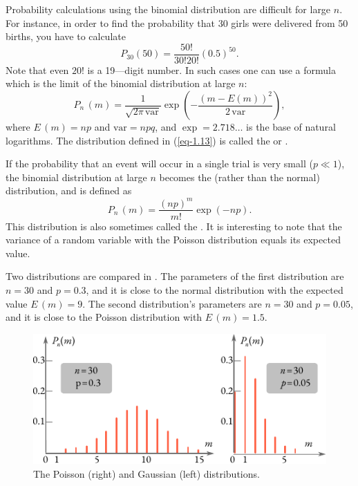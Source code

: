  Probability calculations using the
binomial distribution are difficult for large $n$. For instance, in order to
find the probability that 30 girls were delivered from 50 births, you have
to calculate
\begin{equation*}
P_{30}(50) = \frac{50!}{30!20!} (0.5)^{50}.
\end{equation*}
Note that even $20!$ is a 19—digit number. In such cases one can use a
formula which is the limit of the binomial distribution at large $n$:
\begin{equation}%
P_{n}\,(m) = \frac{1}{\sqrt{2 \pi \, \textrm{var}}} \exp \left( -  \frac{(m - E(m))^{2}}{2 \, \textrm{var}}  \right),
\label{eq-1.13}
\end{equation}
where $E\,(m) = np$ and $\textrm{var} = npq$, and $\exp = 2.718 \ldots$
is the base of natural logarithms. The distribution deﬁned in
(\ref{eq-1.13}) is called the  or .


 If the probability that an event will
occur in a single trial is very small ($p \ll1$), the binomial distribution at
large $n$  becomes the  (rather than the normal) distribution, and is deﬁned as
\begin{equation}%
P_{n}\,(m) = \frac{(np)^{m}}{m!} \exp (-np).
\label{eq-1.14}
\end{equation}
This distribution is also sometimes called the . It is
interesting to note that the variance of a random variable with
the Poisson distribution equals its expected value.

Two distributions are compared in . The parameters of the
first distribution are $n = 30$ and $p = 0.3$, and it is close to the normal
distribution with the expected value $E\, (m) = 9$. The second distribution’s
parameters are $n = 30$ and $p = 0.05$, and it is close to the Poisson
distribution with $E\,(m)= 1.5$.

\begin{figure}[!h]
 \centering
 \includegraphics[width=0.9\tfwidth]{figures/poisson-gaussian.pdf}
\caption{The Poisson (right) and Gaussian (left) distributions.
\label{poisson-gaussian}}
 \end{figure}

